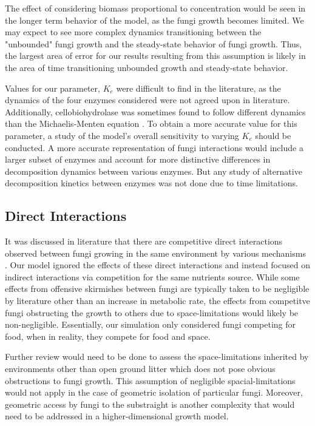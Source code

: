 \documentclass[12pt]{article}
\begin{document}
\begin{multicols}{2}
The effect of considering biomass proportional to concentration would be seen in the longer term behavior of the model, as the fungi growth becomes limited. We may expect to see more complex dynamics transitioning between the "unbounded" fungi growth and the steady-state behavior of fungi growth. Thus, the largest area of error for our results resulting from this assumption is likely in the area of time transitioning unbounded growth and steady-state behavior.

Values for our parameter, $K_e$ were difficult to find in the literature, as the dynamics of the four enzymes considered were not agreed upon in literature. Additionally, cellobiohydrolase was sometimes found to follow different dynamics than the Michaelis-Menten equation \cite{Razavi2015}. To obtain a more accurate value for this parameter, a study of the model's overall sensitivity to varying $K_e$ should be conducted. A more accurate representation of fungi interactions would include a larger subset of enzymes and account for more distinctive differences in decomposition dynamics between various enzymes. But any study of alternative decomposition kinetics between enzymes was not done due to time limitations. 

\subsection{Direct Interactions}

It was discussed in literature that there are competitive direct interactions observed between fungi growing in the same environment by various mechanisms \cite{Boddy2000}. Our model ignored the effects of these direct interactions and instead focused on indirect interactions via competition for the same nutrients source. While some effects from offensive skirmishes between fungi are typically taken to be negligible by literature other than an increase in metabolic rate, the effects from competitve fungi obstructing the growth to others due to space-limitations would likely be non-negligible. Essentially, our simulation only considered fungi competing for food, when in reality, they compete for food and space. 

Further review would need to be done to assess the space-limitations inherited by environments other than open ground litter which does not pose obvious obstructions to fungi growth. This assumption of negligible spacial-limitations would not apply in the case of geometric isolation of particular fungi. Moreover, geometric access by fungi to the substraight is another complexity that would need to be addressed in a higher-dimensional growth model. 


\end{multicols}
\end{document}
